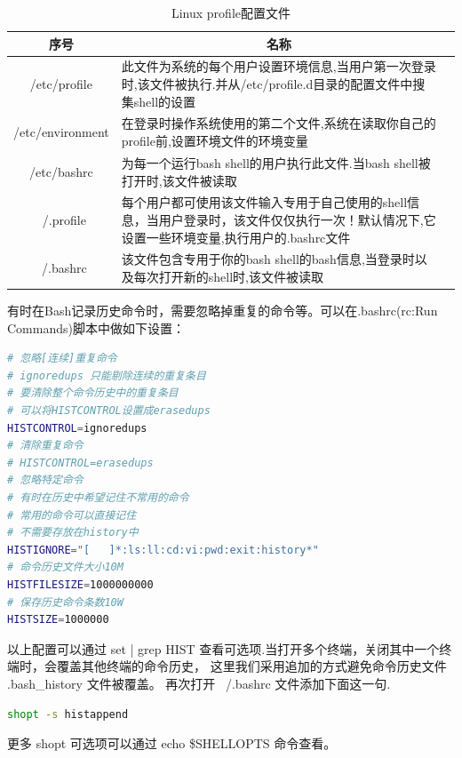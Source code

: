 \documentclass[12pt]{book}
\numberwithin{dummy}{section}
\theoremstyle{ocrenumbox}
\theoremstyle{blacknumex}
\theoremstyle{blacknumbox}
\theoremstyle{ocrenum}
\begin{document}
\begin{table}
	\caption{Linux profile配置文件}
	\label{table:linuxconfigfile}
	\begin{center}
	\begin{tabular}{cp{10cm}c}
		\hline
		\multirow{1}{*}{序号}
		& \multicolumn{1}{c}{名称}  \\
		\hline			
		/etc/profile  & 此文件为系统的每个用户设置环境信息,当用户第一次登录时,该文件被执行.并从/etc/profile.d目录的配置文件中搜集shell的设置 \\
		\hline	
		/etc/environment & 在登录时操作系统使用的第二个文件,系统在读取你自己的profile前,设置环境文件的环境变量 \\
		\hline
		/etc/bashrc & 为每一个运行bash shell的用户执行此文件.当bash shell被打开时,该文件被读取\\
		\hline
		~/.profile & 每个用户都可使用该文件输入专用于自己使用的shell信息，当用户登录时，该文件仅仅执行一次！默认情况下,它设置一些环境变量,执行用户的.bashrc文件\\
		\hline
		~/.bashrc &  该文件包含专用于你的bash shell的bash信息,当登录时以及每次打开新的shell时,该文件被读取\\
		\hline
	\end{tabular}	
	\end{center}
\end{table}

有时在Bash记录历史命令时，需要忽略掉重复的命令等。可以在.bashrc(rc:Run Commands)脚本中做如下设置：

\begin{lstlisting}[language=Bash]
# 忽略[连续]重复命令
# ignoredups 只能剔除连续的重复条目
# 要清除整个命令历史中的重复条目
# 可以将HISTCONTROL设置成erasedups
HISTCONTROL=ignoredups
# 清除重复命令
# HISTCONTROL=erasedups
# 忽略特定命令
# 有时在历史中希望记住不常用的命令
# 常用的命令可以直接记住
# 不需要存放在history中
HISTIGNORE="[   ]*:ls:ll:cd:vi:pwd:exit:history*"
# 命令历史文件大小10M
HISTFILESIZE=1000000000
# 保存历史命令条数10W
HISTSIZE=1000000
\end{lstlisting}

以上配置可以通过 set | grep HIST 查看可选项.当打开多个终端，关闭其中一个终端时，会覆盖其他终端的命令历史， 这里我们采用追加的方式避免命令历史文件 .bash\_history 文件被覆盖。 再次打开 ~/.bashrc 文件添加下面这一句.

\begin{lstlisting}[language=Bash]
shopt -s histappend
\end{lstlisting}

更多 shopt 可选项可以通过 echo \$SHELLOPTS 命令查看。
\end{document}
